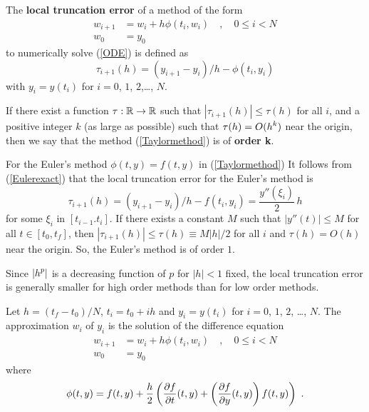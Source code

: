 \begin{defn}
The
{\bfseries local truncation error} of a method of the form 
\begin{equation} \label{Taylormethod}
\begin{split}
w_{i+1} & = w_i + h \phi(t_i,w_i) \quad, \quad 0 \leq i < N \\
w_0 & = y_0
\end{split}
\end{equation}
to numerically solve (\ref{ODE}) is defined as
\begin{equation} \label{truncerror}
\tau_{i+1}(h) = (y_{i+1} - y_i)/h - \phi(t_i,y_i)
\end{equation}
with $y_i = y(t_i)$ for $i=0$, $1$, $2$,\ldots, $N$.

If there exist a function $\tau:\mathbb{R}\to\mathbb{R}$ such that
$|\tau_{i+1}(h) | \leq \tau(h)$ for all $i$, and a positive
integer $k$ (as large as possible) such that
$\displaystyle \tau(h) = O(h^k)$ near
the origin, then we say that the method (\ref{Taylormethod}) is of
{\bfseries order k}.
\label{localTruncErrorDef}
\end{defn}

\begin{egg}
For the Euler's method $\phi(t,y) = f(t,y)$ in (\ref{Taylormethod})
It follows from (\ref{Eulerexact}) that the local truncation error for
the Euler's method is
\[
\tau_{i+1}(h) = (y_{i+1} - y_i)/h - f(t_i,y_i) =
\frac{y''(\xi_i)}{2}\,h
\]
for some $\xi_i$ in $[t_{i-1}.t_i]$.  If there exists a constant $M$
such that $|y''(t)| \leq M$ for all $t\in [t_0,t_f]$, then
$|\tau_{i+1}(h)| \leq \tau(h) \equiv M|h|/2$ for all $i$ and
$\tau(h) = O(h)$ near the origin.  So, the Euler's method is of order $1$.
\end{egg}

\begin{rmk} Since $\displaystyle |h^p|$ is a decreasing function of
$p$ for $|h|<1$ fixed, the local truncation error is generally smaller
for high order methods than for low order methods.
\end{rmk}

\begin{defn}
Let $h=(t_f-t_0)/N$, $t_i=t_0+ih$ and $y_i = y(t_i)$ for $i=0$,
$1$, $2$, \ldots, $N$.  The approximation $w_i$ of $y_i$ is the
solution of the difference equation
\[
\begin{split}
w_{i+1} & = w_i + h\phi(t_i, w_i) \quad, \quad 0 \leq i < N \\
w_0 & = y_0
\end{split}
\]
where
\[
\phi(t,y) = f(t,y) + \frac{h}{2} \left(\frac{\partial{f}}{\partial{t}}(t,y) +
\left( \frac{\partial{f}}{\partial{y}}(t,y) \right)f(t,y) \right) \ .
\]
\label{Tayloralgo}
\end{defn}

